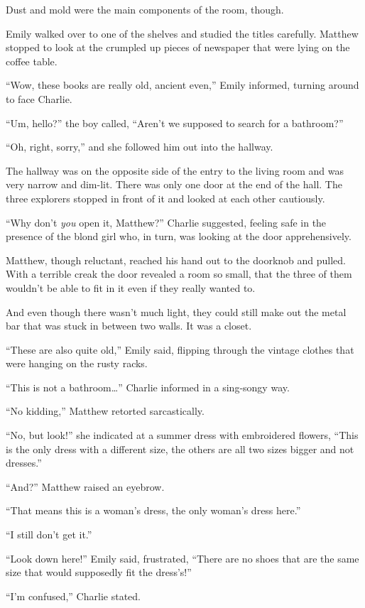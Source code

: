 Dust and mold were the main components of the room, though.

Emily walked over to one of the shelves and studied the titles carefully. Matthew stopped to look at the crumpled up pieces of newspaper that were lying on the coffee table.

“Wow, these books are really old, ancient even,” Emily informed, turning around to face Charlie.

“Um, hello?” the boy called, “Aren't we supposed to search for a bathroom?”

“Oh, right, sorry,” and she followed him out into the hallway.

The hallway was on the opposite side of the entry to the living room and was very narrow and dim-lit. There was only one door at the end of the hall. The three explorers stopped in front of it and looked at each other cautiously.

“Why don't \textit{you} open it, Matthew?” Charlie suggested, feeling safe in the presence of the blond girl who, in turn, was looking at the door apprehensively.

Matthew, though reluctant, reached his hand out to the doorknob and pulled. With a terrible creak the door revealed a room so small, that the three of them wouldn't be able to fit in it even if they really wanted to.

And even though there wasn't much light, they could still make out the metal bar that was stuck in between two walls. It was a closet.

“These are also quite old,” Emily said, flipping through the vintage clothes that were hanging on the rusty racks.

“This is not a bathroom…” Charlie informed in a sing-songy way.

“No kidding,” Matthew retorted sarcastically.

“No, but look!” she indicated at a summer dress with embroidered flowers, “This is the only dress with a different size, the others are all two sizes bigger and not dresses.”

“And?” Matthew raised an eyebrow.

“That means this is a woman's dress, the only woman's dress here.”

“I still don't get it.”

“Look down here!” Emily said, frustrated, “There are no shoes that are the same size that would supposedly fit the dress's!”

“I'm confused,” Charlie stated.

